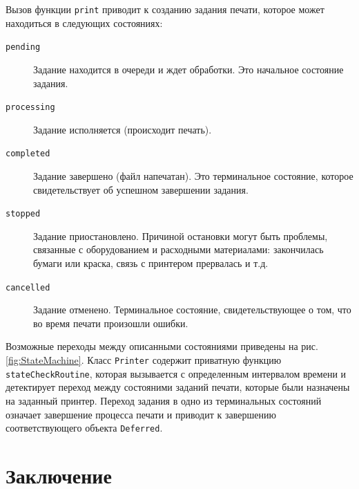 \documentclass[a4paper,14pt,href]{article}
\begin{document}
Вызов функции \texttt{print} приводит к созданию задания печати, которое может находиться в следующих состояниях:
\begin{description}
  \item[\texttt{pending}] Задание находится в очереди и ждет обработки. Это начальное состояние задания.
  \item[\texttt{processing}] Задание исполняется (происходит печать).
  \item[\texttt{completed}] Задание завершено (файл напечатан). Это терминальное состояние, которое свидетельствует
  об успешном завершении задания.
  \item[\texttt{stopped}] Задание приостановлено. Причиной остановки могут быть проблемы, связанные с оборудованием и
  расходными материалами: закончилась бумаги или краска, связь с принтером прервалась и т.д.
  \item[\texttt{cancelled}] Задание отменено. Терминальное состояние, свидетельствующее о том, что во время печати
  произошли ошибки.
\end{description}

Возможные переходы между описанными состояниями приведены на рис. \ref{fig:StateMachine}. Класс \texttt{Printer} содержит
приватную функцию \texttt{stateCheckRou\-ti\-ne}, которая вызывается с определенным интервалом времени и детектирует
переход между состояними заданий печати, которые были назначены на заданный принтер. Переход задания в одно из терминальных
состояний означает завершение процесса печати и приводит к завершению соответствующего объекта \texttt{Deferred}.



\newpage
\section*{Заключение}


\newpage
{}



\end{document}
